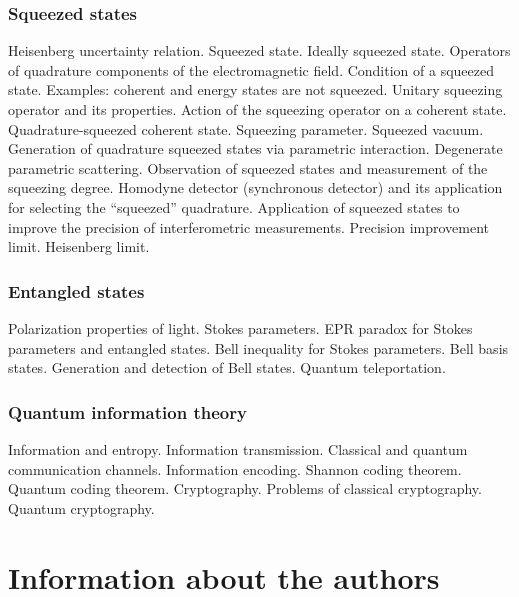 \subsubsection{Squeezed states}
Heisenberg uncertainty relation. Squeezed state. Ideally
squeezed state. Operators of quadrature components
of the electromagnetic field. Condition of a squeezed state. Examples:
coherent and energy states are not squeezed. Unitary
squeezing operator and its properties. Action of the squeezing operator on
a coherent state. Quadrature-squeezed coherent
state. Squeezing parameter. Squeezed vacuum. Generation of quadrature
squeezed states via parametric interaction. Degenerate
parametric scattering. Observation of squeezed states and measurement
of the squeezing degree. Homodyne detector (synchronous detector) and its
application for selecting the ``squeezed'' quadrature. Application of squeezed
states to improve the precision of interferometric measurements. Precision improvement limit. Heisenberg limit.
\subsubsection{Entangled states}
Polarization properties of light. Stokes parameters. EPR paradox for Stokes
  parameters and entangled states. Bell inequality for Stokes
  parameters. Bell basis states. Generation and detection of Bell
  states. Quantum teleportation.
\subsubsection{Quantum information theory}
Information and entropy. Information transmission. Classical and quantum
communication channels. Information encoding. Shannon coding
theorem. Quantum coding theorem. Cryptography. Problems
of classical cryptography. Quantum cryptography.
\newpage
\section{Information about the authors}

